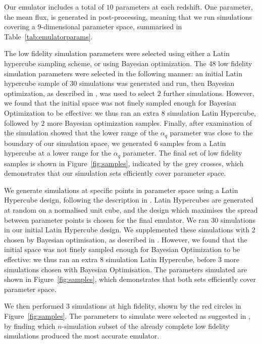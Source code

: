\documentclass[a4paper,11pt]{article}
\begin{document}

Our emulator includes a total of $10$ parameters at each redshift. One parameter, the mean flux, is generated in post-processing, meaning that we run simulations covering a $9$-dimensional parameter space, summarised in Table~\ref{tab:emulatorparams}.

The low fidelity simulation parameters were selected using either a Latin hypercube sampling scheme, or using Bayesian optimization.
The $48$ low fidelity simulation parameters were selected in the following manner: an initial Latin hypercube sample of $30$ simulations was generated and run, then Bayesian optimization, as described in \cite{Rogers:2019}, was used to select $2$ further simulations.
However, we found that the initial space was not finely sampled enough for Bayesian Optimization to be effective: we thus ran an extra $8$ simulation Latin Hypercube, followed by $2$ more Bayesian optimization samples. Finally, after examination of the simulation showed that the lower range of the $\alpha_q$ parameter was close to the boundary of our simulation space, we generated $6$ samples from a Latin hypercube at a lower range for the $\alpha_q$ parameter.
The final set of low fidelity samples is shown in Figure~\ref{fig:samples}, indicated by the grey crosses, which demonstrates that our simulation sets efficiently cover parameter space.

We generate simulations at specific points in parameter space using a Latin Hypercube design, following the description in \cite{Bird:2019}. Latin Hypercubes are generated at random on a normalised unit cube, and the design which maximises the spread between parameter points is chosen for the final emulator. We ran $30$ simulations in our initial Latin Hypercube design. We supplemented these simulations with $2$ chosen by Bayesian optimisation, as described in \cite{Rogers:2019}. However, we found that the initial space was not finely sampled enough for Bayesian Optimization to be effective: we thus ran an extra $8$ simulation Latin Hypercube, before $3$ more simulations chosen with Bayesian Optimisation. The parameters simulated are shown in Figure~\ref{fig:samples}, which demonstrates that both sets efficiently cover parameter space.

We then performed $3$ simulations at high fidelity, shown by the red circles in Figure~\ref{fig:samples}. The parameters to simulate were selected as suggested in \cite{Ho:2022,Fernandez:2022}, by finding which $n$-simulation subset of the already complete low fidelity simulations produced the most accurate emulator.
\end{document}
